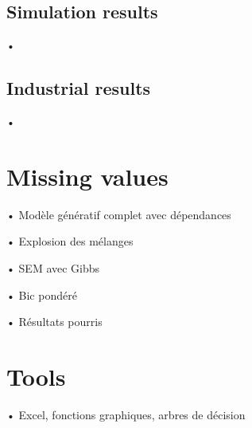 \documentclass[11pt]{beamer}
\begin{document}
	\subsection{Simulation results}
		\begin{frame}{•}
		
		\end{frame}
	\subsection{Industrial results}
		\begin{frame}{•}
		
		\end{frame}
\section{Missing values}
	\begin{frame}{•}
	Modèle génératif complet avec dépendances
	\end{frame}
	\begin{frame}{•}
	Explosion des mélanges 
	\end{frame}
	\begin{frame}{•}
	SEM avec Gibbs 
	\end{frame}
	\begin{frame}{•}
	Bic pondéré 
	\end{frame}
	\begin{frame}{•}
	Résultats pourris 
	\end{frame}
\section{Tools}
	\begin{frame}{•}
		Excel, fonctions graphiques, arbres de décision
	\end{frame}

\begin{frame}

%

\end{frame}
\end{document}
